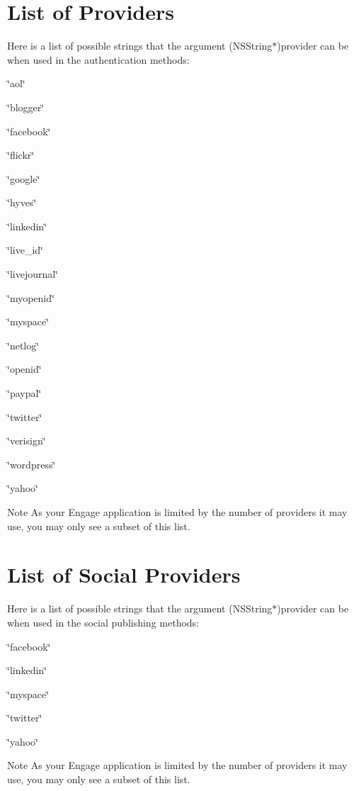 \hypertarget{_providers_basicProviders}{}\section{List of Providers}\label{_providers_basicProviders}
Here is a list of possible strings that the argument (NSString$\ast$)provider can be when used in the authentication methods:
\begin{DoxyItemize}
\item \char`\"{}aol\char`\"{}
\item \char`\"{}blogger\char`\"{}
\item \char`\"{}facebook\char`\"{}
\item \char`\"{}flickr\char`\"{}
\item \char`\"{}google\char`\"{}
\item \char`\"{}hyves\char`\"{}
\item \char`\"{}linkedin\char`\"{}
\item \char`\"{}live\_\-id\char`\"{}
\item \char`\"{}livejournal\char`\"{}
\item \char`\"{}myopenid\char`\"{}
\item \char`\"{}myspace\char`\"{}
\item \char`\"{}netlog\char`\"{}
\item \char`\"{}openid\char`\"{}
\item \char`\"{}paypal\char`\"{}
\item \char`\"{}twitter\char`\"{}
\item \char`\"{}verisign\char`\"{}
\item \char`\"{}wordpress\char`\"{}
\item \char`\"{}yahoo\char`\"{}
\end{DoxyItemize}

\begin{DoxyNote}{Note}
As your Engage application is limited by the number of providers it may use, you may only see a subset of this list.
\end{DoxyNote}
\hypertarget{_providers_socialProviders}{}\section{List of Social Providers}\label{_providers_socialProviders}
Here is a list of possible strings that the argument (NSString$\ast$)provider can be when used in the social publishing methods:
\begin{DoxyItemize}
\item \char`\"{}facebook\char`\"{}
\item \char`\"{}linkedin\char`\"{}
\item \char`\"{}myspace\char`\"{}
\item \char`\"{}twitter\char`\"{}
\item \char`\"{}yahoo\char`\"{}
\end{DoxyItemize}

\begin{DoxyNote}{Note}
As your Engage application is limited by the number of providers it may use, you may only see a subset of this list. 
\end{DoxyNote}
